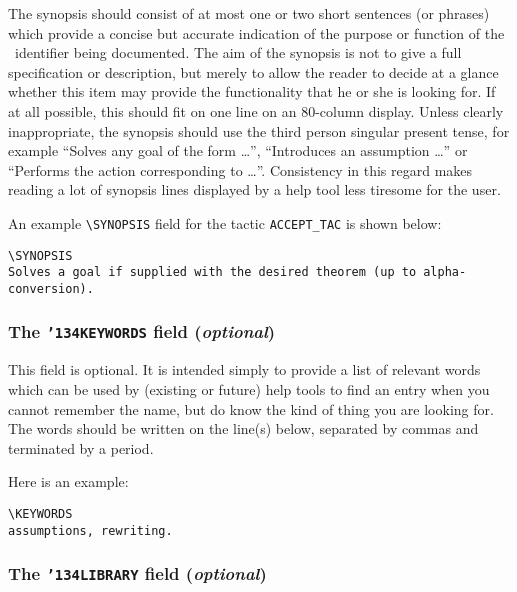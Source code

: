 \documentclass[12pt]{article}
\begin{document}
The synopsis should consist of at most one or two short sentences (or phrases)
which provide a concise but accurate indication of the purpose or function of
the \ML\ identifier being documented.  The aim of the synopsis is not to give
a full specification or description, but merely to allow the reader to decide
at a glance whether this item may provide the functionality that he or she is
looking for. If at all possible, this should fit on one line on an 80-column
display. Unless clearly inappropriate, the synopsis should use the third
person singular present tense, for example ``Solves any goal of the form
\ldots'', ``Introduces an assumption \ldots'' or ``Performs the action
corresponding to \ldots''. Consistency in this regard makes reading a lot of
synopsis lines displayed by a help tool less tiresome for the user.

An example {\small\verb!\SYNOPSIS!} field for the tactic
{\small\verb!ACCEPT_TAC!} is shown below:

\smallskip

\begin{holboxed}\begin{verbatim}
\SYNOPSIS
Solves a goal if supplied with the desired theorem (up to alpha-conversion).
\end{verbatim}\end{holboxed}

\smallskip

\subsubsection{The {\tt {\char'134}KEYWORDS} field ({\it optional})}

This field is optional. It is intended simply to provide a list of relevant
words which can be used by (existing or future) help tools to find an entry
when you cannot remember the name, but do know the kind of thing you are
looking for. The words should be written on the line(s) below, separated by
commas and terminated by a period.

Here is an example:

\smallskip

\begin{holboxed}\begin{verbatim}
\KEYWORDS
assumptions, rewriting.
\end{verbatim}\end{holboxed}

\smallskip

\subsubsection{The {\tt {\char'134}LIBRARY} field ({\it optional})}
\end{document}
